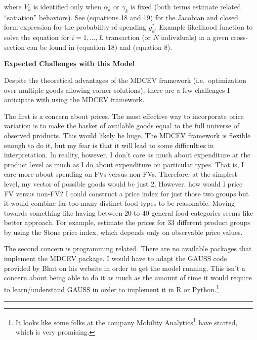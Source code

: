 \documentclass[12pt,letterpaperpaper,]{book}
\renewcommand{\href}[2]{#2\footnote{\url{#1}}}
\begin{document}
where \(V_k\) is identified only when \(\alpha_k\) or \(\gamma_k\) is
fixed (both terms estimate related ``satiation'' behaviors). See
\citet{bhat_multiple_2008} (equations 18 and 19) for the Jacobian and
closed form expression for the probability of spending \(y_k^*\).
Example likelihood function to solve the equation for \(i=1,...,L\)
transaction (or \(N\) individuals) in a given cross-section can be found
in \citet{bhat_multiple_2005} (equation 18) and
\citet{bhat_household_2006} (equation 8).

\textbf{Expected Challenges with this Model}

Despite the theoretical advantages of the MDCEV framework
(i.e.~optimization over multiple goods allowing corner solutions), there
are a few challenges I anticipate with using the MDCEV framework.

The first is a concern about prices. The most effective way to
incorporate price variation is to make the basket of available goods
equal to the full universe of observed products. This would likely be
huge. The MDCEV framework is flexible enough to do it, but my fear is
that it will lead to some difficulties in interpretation. In reality,
however, I don't care as much about expenditure at the product level as
much as I do about expenditure on particular types. That is, I care more
about spending on FVs versus non-FVs. Therefore, at the simplest level,
my vector of possible goods would be just 2. However, how would I price
FV versus non-FV? I could construct a price index for just those two
groups but it would combine far too many distinct food types to be
reasonable. Moving towards something like having between 20 to 40
general food categories seems like better approach. For example,
\citet{harding_effect_2014} estimate the prices for 33 different product
groups by using the Stone price index, which depends only on observable
price values.

The second concern is programming related. There are no available
packages that implement the MDCEV package. I would have to adapt the
GAUSS code provided by Bhat on his website in order to get the model
running. This isn't a concern about being able to do it as much as the
amount of time it would require to learn/understand GAUSS in order to
implement it in R or Python.\footnote{It looks like some folks at the
  company \href{http://www.mobilityanalytics.org}{Mobility Analytics}
  have started, which is very promising.}

\begin{center}\rule{0.5\linewidth}{\linethickness}\end{center}
\end{document}
